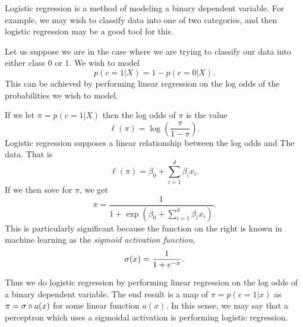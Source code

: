 \label{logisticReg}
Logistic regression is a method of modeling a binary dependent variable.  For 
example, we may wish to classify data into one of two categories, and then 
logistic regression may be a good tool for this.

Let us suppose we are in the case where we are trying to classify our data into either class \(0\) or \(1\).  We wish to model  \[p(c=1|X) = 1-p(c=0|X).\] This can be achieved by performing linear regression on the log odds of the probabilities we wish to model.

If we let \(\pi=p(c=1|X)\) then the log odds of \(\pi\) is the value
\[\ell(\pi) = \log\left(\frac{\pi}{1-\pi}\right).\]
Logistic regression supposes a linear relationship between the log odds and 
The data.  That is
\[\ell(\pi) = \beta_0+\sum_{i=1}^{d} \beta_ix_i.\]
If we then sove for \(\pi\), we get 
\[\pi = \frac{1}{1+\exp(\beta_0+\sum_{i=1}^{d} \beta_ix_i)}.\]
This is particularly significant because the function on the right is known in 
machine learning as the \textit{sigmoid activation function}, 
\[\sigma(x) =\frac{1}{1+e^{-x}}.\]

Thus we do logistic regression by performing linear regression on the log odds 
of a binary dependent variable.  The end result is a map of \(\pi = p(c=1|x)\) 
as \(\pi = \sigma\circ a(x)\) for some linear function \(a(x)\). In this sense, we
may say that a perceptron which uses a sigmoidal activation is performing 
logistic regression.